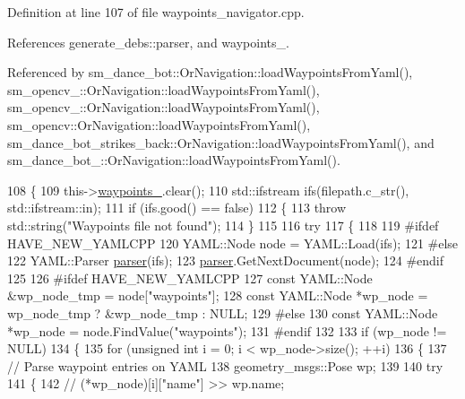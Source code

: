 Definition at line 107 of file waypoints\+\_\+navigator.\+cpp.



References generate\+\_\+debs\+::parser, and waypoints\+\_\+.



Referenced by sm\+\_\+dance\+\_\+bot\+::\+Or\+Navigation\+::load\+Waypoints\+From\+Yaml(), sm\+\_\+opencv\+\_\+::\+Or\+Navigation\+::load\+Waypoints\+From\+Yaml(), sm\+\_\+opencv\+\_\+::\+Or\+Navigation\+::load\+Waypoints\+From\+Yaml(), sm\+\_\+opencv\+::\+Or\+Navigation\+::load\+Waypoints\+From\+Yaml(), sm\+\_\+dance\+\_\+bot\+\_\+strikes\+\_\+back\+::\+Or\+Navigation\+::load\+Waypoints\+From\+Yaml(), and sm\+\_\+dance\+\_\+bot\+\_\+::\+Or\+Navigation\+::load\+Waypoints\+From\+Yaml().


\begin{DoxyCode}
108 \{
109   this->\hyperlink{classcl__move__base__z_1_1WaypointNavigator_a727f6a73e15ff5dc6bb3ffdf52c3d832}{waypoints\_}.clear();
110   std::ifstream ifs(filepath.c\_str(), std::ifstream::in);
111   \textcolor{keywordflow}{if} (ifs.good() == \textcolor{keyword}{false})
112   \{
113     \textcolor{keywordflow}{throw} std::string(\textcolor{stringliteral}{"Waypoints file not found"});
114   \}
115 
116   \textcolor{keywordflow}{try}
117   \{
118 
119 \textcolor{preprocessor}{#ifdef HAVE\_NEW\_YAMLCPP}
120     YAML::Node node = YAML::Load(ifs);
121 \textcolor{preprocessor}{#else}
122     YAML::Parser \hyperlink{namespacegenerate__debs_a4a9ae4bb85fc62d7973ea3d09ced6c26}{parser}(ifs);
123     \hyperlink{namespacegenerate__debs_a4a9ae4bb85fc62d7973ea3d09ced6c26}{parser}.GetNextDocument(node);
124 \textcolor{preprocessor}{#endif}
125 
126 \textcolor{preprocessor}{#ifdef HAVE\_NEW\_YAMLCPP}
127     \textcolor{keyword}{const} YAML::Node &wp\_node\_tmp = node[\textcolor{stringliteral}{"waypoints"}];
128     \textcolor{keyword}{const} YAML::Node *wp\_node = wp\_node\_tmp ? &wp\_node\_tmp : NULL;
129 \textcolor{preprocessor}{#else}
130     \textcolor{keyword}{const} YAML::Node *wp\_node = node.FindValue(\textcolor{stringliteral}{"waypoints"});
131 \textcolor{preprocessor}{#endif}
132 
133     \textcolor{keywordflow}{if} (wp\_node != NULL)
134     \{
135       \textcolor{keywordflow}{for} (\textcolor{keywordtype}{unsigned} \textcolor{keywordtype}{int} i = 0; i < wp\_node->size(); ++i)
136       \{
137         \textcolor{comment}{// Parse waypoint entries on YAML}
138         geometry\_msgs::Pose wp;
139 
140         \textcolor{keywordflow}{try}
141         \{
142           \textcolor{comment}{// (*wp\_node)[i]["name"] >> wp.name;}

\end{DoxyCode}
